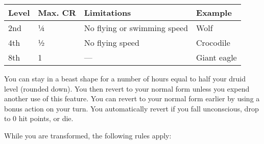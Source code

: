 \documentclass[
]{article}
\begin{document}
\begin{longtable}[]{@{}llll@{}}
\toprule
Level & Max. CR & Limitations & Example\tabularnewline
\midrule
\endhead
2nd & ¼ & No flying or swimming speed & Wolf\tabularnewline
4th & ½ & No flying speed & Crocodile\tabularnewline
8th & 1 & --- & Giant eagle\tabularnewline
\bottomrule
\end{longtable}

You can stay in a beast shape for a number of hours equal to half your
druid level (rounded down). You then revert to your normal form unless
you expend another use of this feature. You can revert to your normal
form earlier by using a bonus action on your turn. You automatically
revert if you fall unconscious, drop to 0 hit points, or die.

While you are transformed, the following rules apply:
\end{document}
